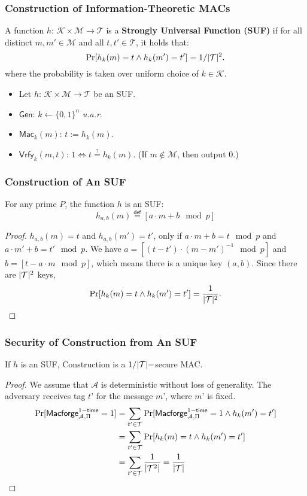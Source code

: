 \begin{frame}\frametitle{Construction of Information-Theoretic MACs}
\begin{definition}
A function $h$: $\mathcal{K} \times \mathcal{M} \to \mathcal{T}$ is a \textbf{Strongly Universal Function (SUF)} if for all distinct $m, m' \in \mathcal{M}$ and all $t, t' \in \mathcal{T}$, it holds that:
\[ \Pr [h_k(m) = t  \land h_k(m') = t'] = 1 / \lvert\mathcal{T}\rvert^2.
\]
where the probability is taken over uniform choice of $k \in \mathcal{K}$.
\end{definition}
\begin{construction}
\begin{itemize}
\item Let $h$: $\mathcal{K} \times \mathcal{M} \to \mathcal{T}$ be an SUF.
\item $\mathsf{Gen}$: $k \gets \{0,1\}^n$ \emph{u.a.r}.
\item $\mathsf{Mac}_k(m)$: $t := h_k(m)$.
\item $\mathsf{Vrfy}_k(m,t)$: $1 \iff t \overset{?}{=} h_k(m)$. (If $m \notin \mathcal{M}$, then output 0.)
\end{itemize}
\end{construction}
\end{frame}
\begin{frame}\frametitle{Construction of An SUF}
\begin{theorem}
For any prime $P$, the function $h$ is an SUF:
\[ h_{a,b}(m) \overset{\mathsf{def}}{=} [ a \cdot m + b \mod p]
\]
\end{theorem}
\begin{proof}
$h_{a,b}(m) = t$ and $h_{a,b}(m') = t'$, only if 
$a \cdot m + b  = t \mod p$  and  $a \cdot m' + b = t' \mod p$. We have $a = [(t-t') \cdot (m - m')^{-1} \mod p]$ and $b = [t - a \cdot m \mod p]$, which means there is a unique key $(a, b)$. Since there are $\lvert\mathcal{T}\rvert^2$ keys, 
\[ \Pr [h_k(m) = t  \land h_k(m') = t'] = \frac{1}{\lvert\mathcal{T}\rvert^2}.
\]
\end{proof}
\end{frame}
\begin{frame}\frametitle{Security of Construction from An SUF}
\begin{theorem}
If $h$ is an SUF, Construction is a $1/\lvert\mathcal{T}\rvert-$secure MAC.
\end{theorem}
\begin{proof}
We assume that $\mathcal{A}$ is deterministic without loss of generality. The adversary receives tag $t’$ for the message $m’$, where $m’$ is fixed.
\[
\begin{split}
\Pr [\mathsf{Macforge}_{\mathcal{A},\Pi}^{1-\mathsf{time}} = 1] &=  \sum_{t' \in \mathcal{T}} \Pr [\mathsf{Macforge}_{\mathcal{A},\Pi}^{1-\mathsf{time}} = 1 \land h_k(m')=t'] \\
&= \sum_{t' \in \mathcal{T}} \Pr [h_k(m)=t \land h_k(m')=t'] \\
&= \sum_{t' \in \mathcal{T}} \frac{1}{\lvert\mathcal{T}^2\rvert} =  \frac{1}{\lvert\mathcal{T}\rvert}
\end{split}
\]
\end{proof}
\end{frame}

